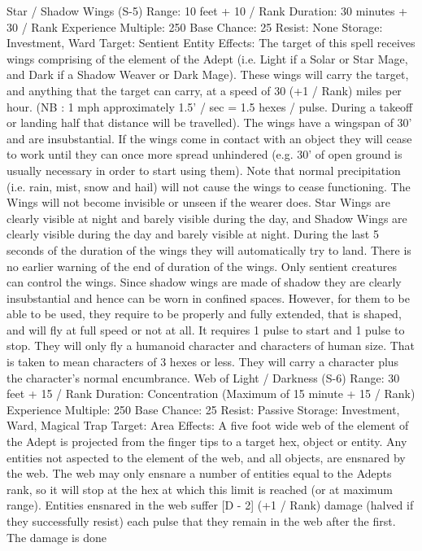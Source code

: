 \documentclass[a4paper]{article}
\begin{document}
\begin{multicols}{3}
Star / Shadow Wings (S-5)
Range: 10 feet + 10 / Rank
Duration: 30 minutes + 30 / Rank
Experience Multiple: 250
Base Chance: 25%
Resist: None
Storage: Investment, Ward
Target: Sentient Entity
Effects: The target of this spell receives wings
comprising of the element of the Adept (i.e. Light
if a Solar or Star Mage, and Dark if a Shadow
Weaver or Dark Mage). These wings will carry the
target, and anything that the target can carry, at a
speed of 30 (+1 / Rank) miles per hour. (NB : 1
mph approximately 1.5’ / sec = 1.5 hexes / pulse.
During a takeoff or landing half that distance will
be travelled). The wings have a wingspan of 30’
and are insubstantial. If the wings come in contact
with an object they will cease to work until they
can once more spread unhindered (e.g. 30’ of open
ground is usually necessary in order to start using
them). Note that normal precipitation (i.e. rain,
mist, snow and hail) will not cause the wings to
cease functioning. The Wings will not become
invisible or unseen if the wearer does. Star Wings
are clearly visible at night and barely visible during
the day, and Shadow Wings are clearly visible
during the day and barely visible at night. During
the last 5 seconds of the duration of the wings they
will automatically try to land. There is no earlier
warning of the end of duration of the wings. Only
sentient creatures can control the wings.
Since shadow wings are made of shadow they are
clearly insubstantial and hence can be worn in
confined spaces. However, for them to be able to
be used, they require to be properly and fully extended, that is shaped, and will fly at full speed or
not at all. It requires 1 pulse to start and 1 pulse to
stop. They will only fly a humanoid character and
characters of human size. That is taken to mean
characters of 3 hexes or less. They will carry a
character plus the character’s normal encumbrance.
Web of Light / Darkness (S-6)
Range: 30 feet + 15 / Rank
Duration: Concentration (Maximum of 15 minute
+ 15 / Rank)
Experience Multiple: 250
Base Chance: 25%
Resist: Passive
Storage: Investment, Ward, Magical Trap
Target: Area
Effects: A five foot wide web of the element of the
Adept is projected from the finger tips to a target
hex, object or entity. Any entities not aspected to
the element of the web, and all objects, are ensnared by the web. The web may only ensnare a
number of entities equal to the Adepts rank, so it
will stop at the hex at which this limit is reached
(or at maximum range). Entities ensnared in the
web suffer [D - 2] (+1 / Rank) damage (halved if
they successfully resist) each pulse that they remain in the web after the first. The damage is done

\end{multicols}
\end{document}
